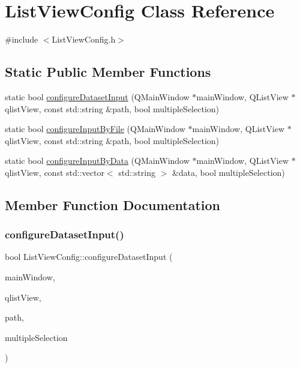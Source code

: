 \hypertarget{class_list_view_config}{}\section{List\+View\+Config Class Reference}
\label{class_list_view_config}


{\ttfamily \#include $<$List\+View\+Config.\+h$>$}

\subsection*{Static Public Member Functions}
\begin{DoxyCompactItemize}
\item 
static bool \hyperlink{class_list_view_config_a018c9bf8ec0f705ebc40076b54aec658}{configure\+Dataset\+Input} (Q\+Main\+Window $\ast$main\+Window, Q\+List\+View $\ast$qlist\+View, const std\+::string \&path, bool multiple\+Selection)
\item 
static bool \hyperlink{class_list_view_config_aa280ece932674550644df1b827f768b0}{configure\+Input\+By\+File} (Q\+Main\+Window $\ast$main\+Window, Q\+List\+View $\ast$qlist\+View, const std\+::string \&path, bool multiple\+Selection)
\item 
static bool \hyperlink{class_list_view_config_a4e5262ada7f3ae203f6ad7b86998def7}{configure\+Input\+By\+Data} (Q\+Main\+Window $\ast$main\+Window, Q\+List\+View $\ast$qlist\+View, const std\+::vector$<$ std\+::string $>$ \&data, bool multiple\+Selection)
\end{DoxyCompactItemize}


\subsection{Member Function Documentation}
\mbox{\label{class_list_view_config_a018c9bf8ec0f705ebc40076b54aec658}} 
\subsubsection{\texorpdfstring{configure\+Dataset\+Input()}{configureDatasetInput()}}
{\footnotesize\ttfamily bool List\+View\+Config\+::configure\+Dataset\+Input (\begin{DoxyParamCaption}\item[{Q\+Main\+Window $\ast$}]{main\+Window,  }\item[{Q\+List\+View $\ast$}]{qlist\+View,  }\item[{const std\+::string \&}]{path,  }\item[{bool}]{multiple\+Selection }\end{DoxyParamCaption})\hspace{0.3cm}{\ttfamily [static]}}

